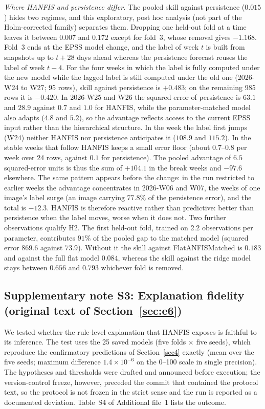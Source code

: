 \documentclass[pdflatex,sn-basic]{sn-jnl}
\theoremstyle{thmstyleone}%
\theoremstyle{thmstyletwo}%
\theoremstyle{thmstylethree}%
\begin{document}
\emph{Where HANFIS and persistence differ.} The pooled skill against persistence ($0.015$) hides two regimes, and
this exploratory, post hoc analysis (not part of the Holm-corrected family) separates them. Dropping one held-out
fold at a time leaves it between $0.007$ and $0.172$ except for fold~3, whose removal gives $-1.168$. Fold~3 ends at
the EPSS model change, and the label of week $t$ is built from snapshots up to $t{+}28$ days ahead whereas the
persistence forecast reuses the label of week $t{-}4$. For the four weeks in which the label is fully computed under the
new model while the lagged label is still computed under the old one (2026-W24 to W27; 95 rows), skill against
persistence is $+0.483$; on the remaining 985 rows it is $-0.420$. In 2026-W25 and W26 the squared error of persistence is
$63.1$ and $28.9$ against $0.7$ and $1.0$ for HANFIS, while the parameter-matched model also adapts ($4.8$ and $5.2$), so the
advantage reflects access to the current EPSS input rather than the hierarchical structure. In the week the label first
jumps (W24) neither HANFIS nor persistence anticipates it ($108.9$ and $115.2$). In the stable weeks that follow
HANFIS keeps a small error floor (about $0.7$--$0.8$ per week over 24 rows, against $0.1$ for persistence). The pooled
advantage of $6.5$ squared-error units is thus the sum of $+104.1$ in the break weeks and $-97.6$ elsewhere. The same
pattern appears before the change: in the run restricted to earlier weeks the advantage concentrates in 2026-W06 and W07,
the weeks of one image's label surge (an image carrying 77.8\% of the persistence error), and the total is $-12.3$.
HANFIS is therefore reactive rather than predictive: better than persistence when the label moves, worse when it does not.
Two further observations qualify H2. The first held-out fold, trained on 2.2 observations per parameter, contributes
$91\%$ of the pooled gap to the matched model (squared error $869.6$ against $73.9$). Without it the skill against
FlatANFISMatched is $0.183$ and against the full flat model $0.084$, whereas the skill against the ridge model stays between
$0.656$ and $0.793$ whichever fold is removed.

\subsection*{Supplementary note S3: Explanation fidelity (original text of Section~\ref{sec:e6})}
We tested whether the rule-level explanation that HANFIS exposes is faithful to its inference. The test uses the 25 saved models (five folds $\times$ five seeds), which reproduce the confirmatory predictions of Section~\ref{sec4} exactly (mean over the five seeds; maximum difference $1.4\times10^{-6}$ on the 0--100 scale in single precision). The hypotheses and thresholds were drafted and announced before execution; the version-control freeze, however, preceded the commit that contained the protocol text, so the protocol is not frozen in the strict sense and the run is reported as a documented deviation. Table~S4 of Additional file~1 lists the outcome.
\end{document}
